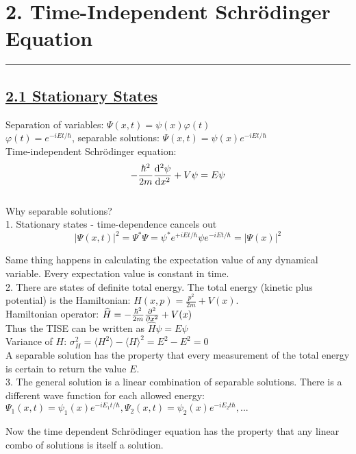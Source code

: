 \section{2. Time-Independent Schr\"{o}dinger Equation} \hrule height 0.3pt \thinspace

\subsection{\underline{2.1 Stationary States}}
Separation of variables: $\Psi(x, t) = \psi(x) \varphi(t)$ \\

$\varphi(t) = e^{-iEt/\hbar}$, separable solutions: $\Psi(x, t) = \psi(x) e^{-iEt / \hbar}$ \\

Time-independent Schr\"{o}dinger equation:
$$-\frac{\hbar^2 }{2m} \dv[2]{\psi}{x} + V \psi = E \psi $$ \\

Why separable solutions? \\
1. Stationary states - time-dependence cancels out
    $$|\Psi(x,t)|^2 = \Psi^* \Psi = \psi^* e^{+iEt/\hbar} \psi e^{-iEt/\hbar} = |\Psi(x)|^2$$

    Same thing happens in calculating the expectation value of any dynamical variable. Every expectation value is constant in time. \\

2. There are states of definite total energy. The total energy (kinetic plus potential) is the Hamiltonian: $H(x, p) = \frac{p^2}{2m} + V(x)$. \\

Hamiltonian operator: $\widehat{H} = -\frac{\hbar^2}{2m} \pdv[2]{}{x} + V(x)$ \\
Thus the TISE can be written as $\widehat{H} \psi = E \psi$ \\
Variance of $H$: $\sigma_{H}^2 = \langle H^2 \rangle - \langle H \rangle ^2 = E^2 - E^2 = 0$ \\
A separable solution has the property that every measurement of the total energy is certain to return the value $E$. \\

3. The general solution is a linear combination of separable solutions. There is a different wave function for each allowed energy: $\Psi_1(x,t) = \psi_1(x) e^{-iE_1 t / \hbar}, \Psi_2(x,t) = \psi_2 (x) e^{-iE_2 t \hbar}, ...$

Now the time dependent Schr\"{o}dinger equation has the property that any linear combo of solutions is itself a solution.

